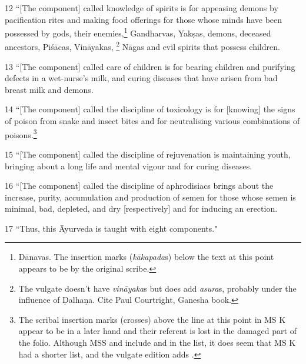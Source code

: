 \begin{translation}
    \item[12] “[The component] called knowledge of spirits is for appeasing
    demons by pacification rites and making food offerings for those whose
    minds have been possessed by gods, their enemies,\footnote{Dānavas.  The
    insertion marks (\emph{kākapada}s) below the text at this point appears to
    be by the original scribe.} Gandharvas, Yakṣas, demons, deceased
    ancestors, Piśācas, Vināyakas, \footnote{The vulgate doesn't have
    \emph{vināyaka}s but does add \emph{asura}s, probably under the influence
    of Ḍalhaṇa.  Cite Paul Courtright, Ganesha book.} Nāgas and evil spirits
    that possess children. %
    
    
    \item[13] “[The component] called care of children is for bearing children and 
    purifying defects in a wet-nurse's milk, and curing diseases that have arisen 
    from bad breast milk and demons.
    
    \item[14] “[The component] called the discipline of toxicology is for
    [knowing] the signs of poison from snake and insect bites and for
    neutralising various combinations of poisons.\footnote{The scribal
    insertion marks (crosses) above the line at this point in MS K appear to
    be in a later hand and their referent is lost in the damaged part of the
    folio.  Although MSS  and  include  and
     in the list, it does seem that MS K had
    a shorter list, and the vulgate edition adds .}
    
    \item[15] “[The component] called the discipline of rejuvenation is 
    maintaining 
    youth, bringing about a long life and mental vigour and for curing diseases.
    
    
    \item[16] “[The component] called the discipline of aphrodisiacs brings about 
    the 
    increase, purity, accumulation and  production of semen for those whose semen 
    is minimal, bad, depleted, and dry [respectively] and for inducing an erection.
    
    \item[17] “Thus, this Āyurveda is taught with eight components."
    

\end{translation}
